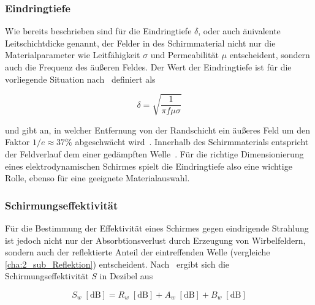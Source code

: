\subsubsection{Eindringtiefe}\label{cha:2_subsub_Eindringtiefe}

Wie bereits beschrieben sind für die Eindringtiefe $\delta$, oder auch äuivalente Leitschichtdicke genannt, der Felder in des Schirmmaterial nicht nur die Materialparameter wie Leitfähigkeit $\sigma$ und Permeabilität $\mu$ entscheident, sondern auch die Frequenz des äußeren Feldes. Der Wert der Eindringtiefe ist für die vorliegende Situation nach~\cite{Taschenbuch_HF-Technik} definiert als

\begin{equation}
    \delta = \sqrt{\frac{1}{\pi f \mu \sigma}}
    \label{eq:2_Eindringtiefe}
\end{equation}

und gibt an, in welcher Entfernung von der Randschicht ein äußeres Feld um den Faktor $1/e \approx 37 \si{\percent}$ abgeschwächt wird~\cite{Taschenbuch_HF-Technik}. Innerhalb des Schirmmaterials entspricht der Feldverlauf dem einer gedämpften Welle~\cite{EM_Schirmung}. Für die richtige Dimensionierung eines elektrodynamischen Schirmes spielt die Eindringtiefe also eine wichtige Rolle, ebenso für eine geeignete Materialauswahl.


\subsubsection{Schirmungseffektivität}\label{cha:2_subsub_Schirmungseffektivitaet}

Für die Bestimmung der Effektivität eines Schirmes gegen eindrigende Strahlung ist jedoch nicht nur der Absorbtionsverlust durch Erzeugung von Wirbelfeldern, sondern auch der reflektierte Anteil der eintreffenden Welle (vergleiche \Abschnitt\ref{cha:2_sub_Reflektion}) entscheident. Nach~\cite{Problems_in_shielding_electronic_equiptment, NASA_SP-3067} ergibt sich die Schirmungseffektivität $S$ in Dezibel aus

\begin{equation}
    S_w \; \left[\text{dB}\right] = R_w \; \left[\text{dB}\right] + A_w \; \left[\text{dB}\right] + B_w \; \left[\text{dB}\right]
\end{equation}

